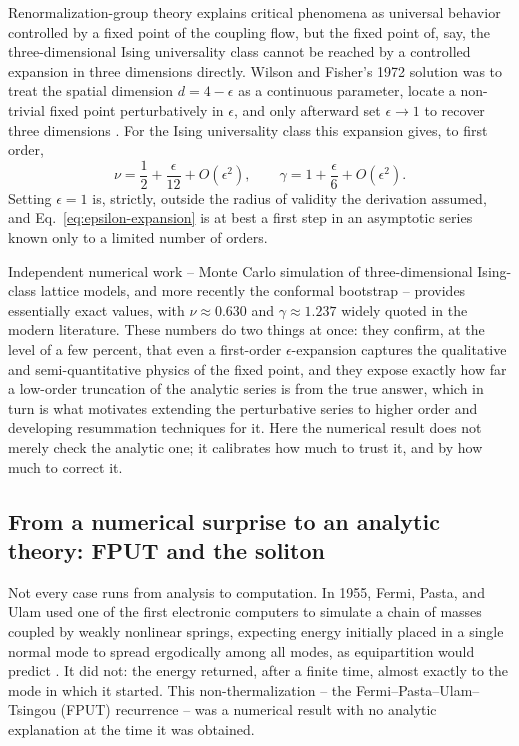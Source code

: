 \documentclass[11pt]{article}
\begin{document}
Renormalization-group theory explains critical phenomena as universal behavior controlled by a fixed point of the coupling flow, but the fixed point of, say, the three-dimensional Ising universality class cannot be reached by a controlled expansion in three dimensions directly. Wilson and Fisher's 1972 solution was to treat the spatial dimension $d = 4-\epsilon$ as a continuous parameter, locate a non-trivial fixed point perturbatively in $\epsilon$, and only afterward set $\epsilon \to 1$ to recover three dimensions \cite{WilsonFisher1972,WilsonKogut1974}. For the Ising universality class this expansion gives, to first order,
\begin{equation}
\nu = \frac{1}{2} + \frac{\epsilon}{12} + O(\epsilon^2), \qquad \gamma = 1 + \frac{\epsilon}{6} + O(\epsilon^2).
\label{eq:epsilon-expansion}
\end{equation}
Setting $\epsilon=1$ is, strictly, outside the radius of validity the derivation assumed, and Eq.~\eqref{eq:epsilon-expansion} is at best a first step in an asymptotic series known only to a limited number of orders.

Independent numerical work -- Monte Carlo simulation of three-dimensional Ising-class lattice models, and more recently the conformal bootstrap -- provides essentially exact values, with $\nu \approx 0.630$ and $\gamma \approx 1.237$ widely quoted in the modern literature. These numbers do two things at once: they confirm, at the level of a few percent, that even a first-order $\epsilon$-expansion captures the qualitative and semi-quantitative physics of the fixed point, and they expose exactly how far a low-order truncation of the analytic series is from the true answer, which in turn is what motivates extending the perturbative series to higher order and developing resummation techniques for it. Here the numerical result does not merely check the analytic one; it calibrates how much to trust it, and by how much to correct it.

\subsection{From a numerical surprise to an analytic theory: FPUT and the soliton}

Not every case runs from analysis to computation. In 1955, Fermi, Pasta, and Ulam used one of the first electronic computers to simulate a chain of masses coupled by weakly nonlinear springs, expecting energy initially placed in a single normal mode to spread ergodically among all modes, as equipartition would predict \cite{FermiPastaUlam1955}. It did not: the energy returned, after a finite time, almost exactly to the mode in which it started. This non-thermalization -- the Fermi--Pasta--Ulam--Tsingou (FPUT) recurrence -- was a numerical result with no analytic explanation at the time it was obtained.
\end{document}
